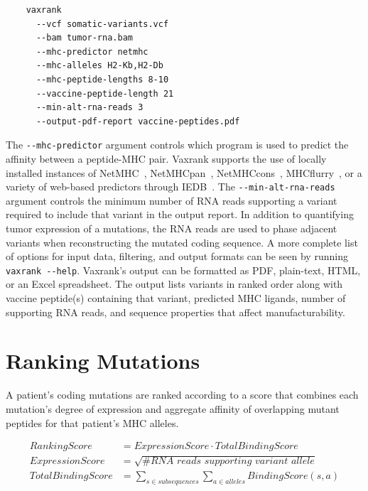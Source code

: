 \documentclass[10pt,letterpaper]{article}
\begin{document}
\vspace{1ex}
\begin{verbatim}
    vaxrank
      --vcf somatic-variants.vcf
      --bam tumor-rna.bam
      --mhc-predictor netmhc
      --mhc-alleles H2-Kb,H2-Db
      --mhc-peptide-lengths 8-10
      --vaccine-peptide-length 21
      --min-alt-rna-reads 3
      --output-pdf-report vaccine-peptides.pdf
\end{verbatim}
\vspace{1ex}

The \verb|--mhc-predictor| argument controls which program is used to predict the affinity between a peptide-MHC pair. Vaxrank supports the use of locally installed instances of NetMHC~\citep{netmhc2016}, NetMHCpan~\citep{netmhcpan2007}, NetMHCcons~\citep{netmhccons}, MHCflurry~\citep{mhcflurry}, or a variety of web-based predictors through IEDB~\citep{iedb}. The \verb|--min-alt-rna-reads| argument controls the minimum number of RNA reads supporting a variant required to include that variant in the output report. In addition to quantifying tumor expression of a mutations, the RNA reads are used to phase adjacent variants when reconstructing the mutated coding sequence. A more complete list of options for input data, filtering, and output formats can be seen by running \verb|vaxrank --help|. Vaxrank's output can be formatted as PDF, plain-text, HTML, or an Excel spreadsheet. The output lists variants in ranked order along with vaccine peptide(s) containing that variant, predicted MHC ligands, number of supporting RNA reads, and sequence properties that affect manufacturability.

\section{Ranking Mutations}
A patient's coding mutations are ranked according to a score that combines each mutation's degree of expression and aggregate affinity of overlapping mutant peptides for that patient's MHC alleles.

\begin{align*}
\textit{RankingScore} 		&= \textit{ExpressionScore} \cdot \textit{TotalBindingScore} \\
\textit{ExpressionScore} 	&= \sqrt{\textit{\# RNA reads supporting variant allele}} \\
\textit{TotalBindingScore} 		&= \sum_{s \in \textit{subsequences}}\sum_{a \in \textit{alleles}}\textit{BindingScore}(s, a)
\end{align*}
\end{document}
